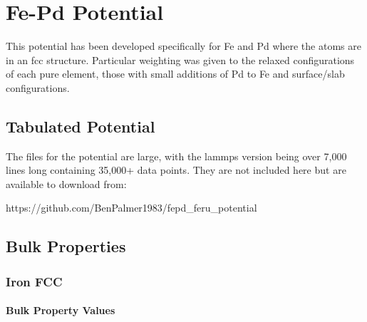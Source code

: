 \chapter{Fe-Pd Potential}
\label{chapter:appendix-fepdpotential}

This potential has been developed specifically for Fe and Pd where the atoms are in an \acrshort{fcc} structure.  Particular weighting was given to the relaxed configurations of each pure element, those with small additions of Pd to Fe and surface/slab configurations.

\section{Tabulated Potential}

The files for the potential are large, with the \acrshort{lammps} version being over 7,000 lines long containing 35,000+ data points.  They are not included here but are available to download from:

https://github.com/BenPalmer1983/fepd\_feru\_potential





\clearpage
\section{Bulk Properties}


\FloatBarrier
\subsection{Iron FCC}

\subsubsection{Bulk Property Values}

